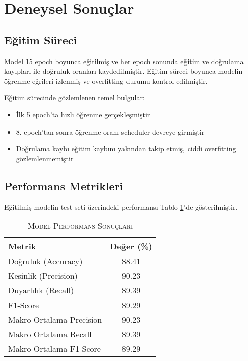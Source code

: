\documentclass[conference, a4paper]{IEEEtran}
\begin{document}
	\section{Deneysel Sonuçlar}
	
	\subsection{Eğitim Süreci}
	
	Model 15 epoch boyunca eğitilmiş ve her epoch sonunda eğitim ve doğrulama kayıpları ile doğruluk oranları kaydedilmiştir. Eğitim süreci boyunca modelin öğrenme eğrileri izlenmiş ve overfitting durumu kontrol edilmiştir.
	
	Eğitim sürecinde gözlemlenen temel bulgular:
	\begin{itemize}
		\item İlk 5 epoch'ta hızlı öğrenme gerçekleşmiştir
		\item 8. epoch'tan sonra öğrenme oranı scheduler devreye girmiştir
		\item Doğrulama kaybı eğitim kaybını yakından takip etmiş, ciddi overfitting gözlemlenmemiştir
	\end{itemize}
	
	\subsection{Performans Metrikleri}
	
	Eğitilmiş modelin test seti üzerindeki performansı Tablo \ref{tablo_results}'de gösterilmiştir.
	
	\begin{table}[h]
		\centering
		\caption{\textsc{Model Performans Sonuçları}}
		\label{tablo_results}
		\begin{tabular}{|l|c|}
			\hline
			\textbf{Metrik} & \textbf{Değer (\%)} \\
			\hline
			Doğruluk (Accuracy) & 88.41 \\
			\hline
			Kesinlik (Precision) & 90.23 \\
			\hline
			Duyarlılık (Recall) & 89.39 \\
			\hline
			F1-Score & 89.29 \\
			\hline
			Makro Ortalama Precision & 90.23 \\
			\hline
			Makro Ortalama Recall & 89.39 \\
			\hline
			Makro Ortalama F1-Score & 89.29 \\
			\hline
		\end{tabular}
	\end{table}
	
\end{document}
